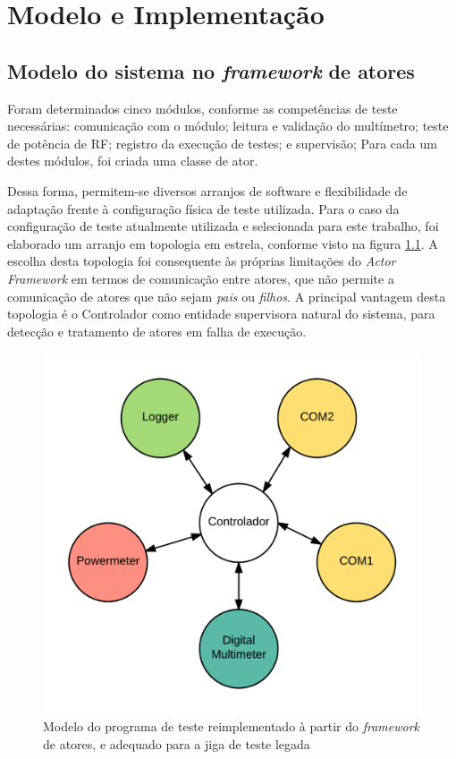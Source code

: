 \chapter{Modelo e Implementação}
\label{modelagem}

    \section{Modelo do sistema no \textit{framework} de atores}
        
        
        Foram determinados cinco módulos, conforme as competências de teste necessárias: comunicação com o módulo; leitura e validação do multímetro; teste de potência de RF; registro da execução de testes; e supervisão; Para cada um destes módulos, foi criada uma classe de ator. 
        
        Dessa forma, permitem-se diversos arranjos de software e flexibilidade de adaptação frente à configuração física de teste utilizada. Para o caso da configuração de teste atualmente utilizada e selecionada para este trabalho, foi elaborado um arranjo em topologia em estrela, conforme visto na figura \ref{fig:modelo}. A escolha desta topologia foi consequente às próprias limitações do \textit{Actor Framework} em termos de comunicação entre atores, que não permite a comunicação de atores que não sejam \textit{pais} ou \textit{filhos}. A principal vantagem desta topologia é o Controlador como entidade supervisora natural do sistema, para detecção e tratamento de atores em falha de execução.
        
        \begin{figure}
            \centering
            \includegraphics[width=0.9\linewidth]{fig/sistemmodel}
            \caption{Modelo do programa de teste reimplementado à partir do \textit{framework} de atores, e adequado para a jiga de teste legada}
            \label{fig:modelo}
        \end{figure}
            
